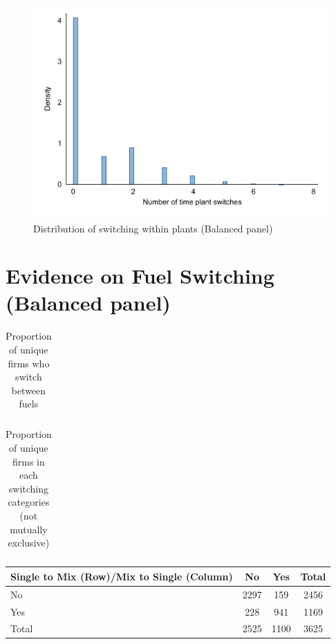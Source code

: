 \documentclass[12pt,notitlepage]{article}
\newcommand{\sym}[1] {\ifmmode^{#1} \else\(^{#1}\) \fi}
\begin{document}
\begin{figure}[!htpb]
\centering
\includegraphics{../Output/Graphs/nTimesSwitch-Dist.pdf}
\caption{Distribution of switching within plants (Balanced panel)}
\end{figure}


\pagebreak




\section{Evidence on Fuel Switching (Balanced panel)}

\begin{table}[!htpb]
	\centering
	\caption{Proportion of unique firms who switch between fuels}
	\begin{tabular}{l*{3}{c}}
		\toprule
		
	\end{tabular}
\end{table}

\begin{table}[!htpb]
	\centering
	\caption{Proportion of unique firms in each switching categories (not mutually exclusive)}
	\begin{tabular}{@{}ccccccc@{}}
		\toprule
		
	\end{tabular}
\end{table}

\centering
{
\def\sym#1{\ifmmode^{#1}\else\(^{#1}\)\fi}
\begin{tabular}{l*{3}{c}}
\hline\hline
Single to Mix (Row)/Mix to Single (Column)&          No&         Yes&       Total\\
\hline
No          &        2297&         159&        2456\\
Yes         &         228&         941&        1169\\
Total       &        2525&        1100&        3625\\
\hline\hline
\end{tabular}
}
\end{document}

